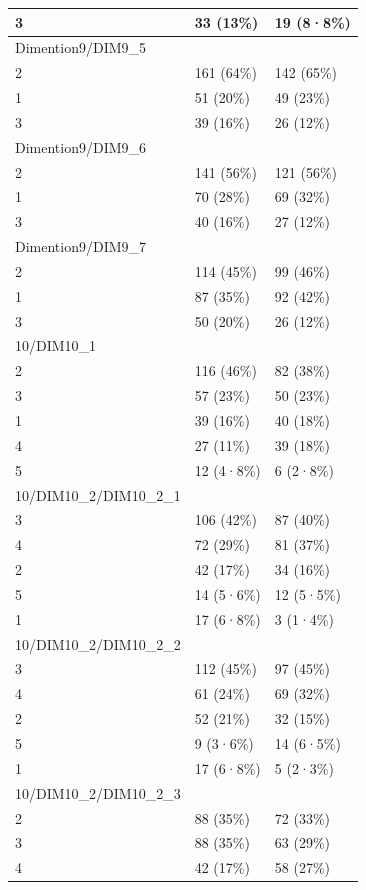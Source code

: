 \documentclass[
]{book}
\begin{document}
\begin{tabular}{l|l|l}
3 & 33 (13\%) & 19 (8·8\%)\\
\hline
Dimention9/DIM9\_5 &  & \\
\hline
2 & 161 (64\%) & 142 (65\%)\\
\hline
1 & 51 (20\%) & 49 (23\%)\\
\hline
3 & 39 (16\%) & 26 (12\%)\\
\hline
Dimention9/DIM9\_6 &  & \\
\hline
2 & 141 (56\%) & 121 (56\%)\\
\hline
1 & 70 (28\%) & 69 (32\%)\\
\hline
3 & 40 (16\%) & 27 (12\%)\\
\hline
Dimention9/DIM9\_7 &  & \\
\hline
2 & 114 (45\%) & 99 (46\%)\\
\hline
1 & 87 (35\%) & 92 (42\%)\\
\hline
3 & 50 (20\%) & 26 (12\%)\\
\hline
10/DIM10\_1 &  & \\
\hline
2 & 116 (46\%) & 82 (38\%)\\
\hline
3 & 57 (23\%) & 50 (23\%)\\
\hline
1 & 39 (16\%) & 40 (18\%)\\
\hline
4 & 27 (11\%) & 39 (18\%)\\
\hline
5 & 12 (4·8\%) & 6 (2·8\%)\\
\hline
10/DIM10\_2/DIM10\_2\_1 &  & \\
\hline
3 & 106 (42\%) & 87 (40\%)\\
\hline
4 & 72 (29\%) & 81 (37\%)\\
\hline
2 & 42 (17\%) & 34 (16\%)\\
\hline
5 & 14 (5·6\%) & 12 (5·5\%)\\
\hline
1 & 17 (6·8\%) & 3 (1·4\%)\\
\hline
10/DIM10\_2/DIM10\_2\_2 &  & \\
\hline
3 & 112 (45\%) & 97 (45\%)\\
\hline
4 & 61 (24\%) & 69 (32\%)\\
\hline
2 & 52 (21\%) & 32 (15\%)\\
\hline
5 & 9 (3·6\%) & 14 (6·5\%)\\
\hline
1 & 17 (6·8\%) & 5 (2·3\%)\\
\hline
10/DIM10\_2/DIM10\_2\_3 &  & \\
\hline
2 & 88 (35\%) & 72 (33\%)\\
\hline
3 & 88 (35\%) & 63 (29\%)\\
\hline
4 & 42 (17\%) & 58 (27\%)\\

\end{tabular}
\end{document}
